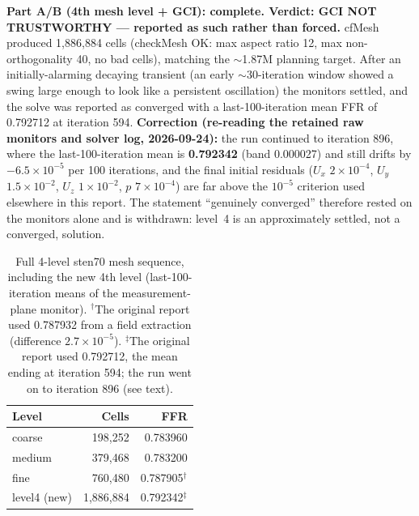 \documentclass[11pt]{article}
\begin{document}
\textbf{Part A/B (4th mesh level + GCI): complete. Verdict: GCI NOT TRUSTWORTHY --- reported as such
rather than forced.} cfMesh produced 1,886,884 cells (checkMesh OK: max aspect ratio 12, max
non-orthogonality 40\textdegree, no bad cells), matching the $\sim$1.87M planning target. After an initially-alarming decaying transient (an early $\sim$30-iteration window
showed a swing large enough to look like a persistent oscillation) the monitors settled, and the solve was
reported as converged with a last-100-iteration mean FFR of 0.792712 at iteration 594.
\textbf{Correction (re-reading the retained raw monitors and solver log, 2026-09-24):} the run continued to
iteration 896, where the last-100-iteration mean is \textbf{0.792342} (band 0.000027) and still drifts by
$-6.5\times10^{-5}$ per 100 iterations, and the final initial residuals ($U_x$ $2\times10^{-4}$, $U_y$
$1.5\times10^{-2}$, $U_z$ $1\times10^{-2}$, $p$ $7\times10^{-4}$) are far above the $10^{-5}$ criterion used elsewhere in this report. The statement ``genuinely converged'' therefore rested on the
monitors alone and is withdrawn: level~4 is an approximately settled, not a converged, solution.

\begin{table}[H]
\centering
\caption{Full 4-level sten70 mesh sequence, including the new 4th level (last-100-iteration means of the measurement-plane monitor). $^\dagger$The original report used 0.787932 from a field extraction (difference $2.7\times10^{-5}$). $^\ddagger$The original report used 0.792712, the mean ending at iteration 594; the run went on to iteration 896 (see text).}
\begin{tabular}{lrr}
\toprule
Level & Cells & FFR \\
\midrule
coarse & 198,252 & 0.783960 \\
medium & 379,468 & 0.783200 \\
fine & 760,480 & 0.787905$^\dagger$ \\
level4 (new) & 1,886,884 & 0.792342$^\ddagger$ \\
\bottomrule
\end{tabular}
\end{table}
\end{document}
